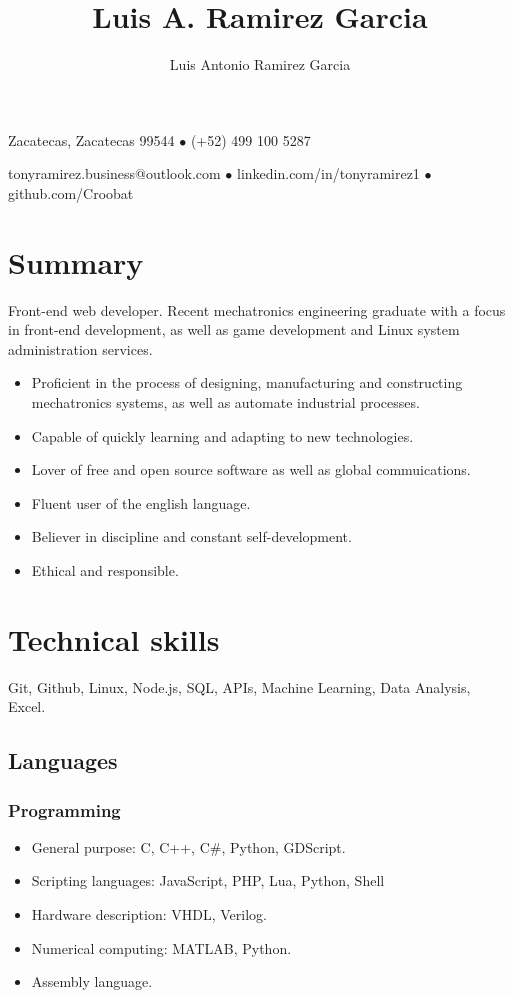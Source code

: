 \documentclass{article}
\author{Luis Antonio Ramirez Garcia}
\title{Luis A. Ramirez Garcia}
\makeatletter
\renewcommand{\maketitle}{
  \begin{center}
    {
      \huge\bfseries
      \theauthor
    }

    \vspace{1em}

    Zacatecas, Zacatecas 99544 $\bullet$ (+52) 499 100 5287

    \vspace{0.5em}

    tonyramirez.business@outlook.com $\bullet$ linkedin.com/in/tonyramirez1 $\bullet$ github.com/Croobat

    \vspace{-0.5em}

  \end{center}
}
\makeatother
\begin{document}

  \maketitle

  \section{Summary}

  Front-end web developer. Recent mechatronics engineering graduate with a focus in front-end development, as well as game development and Linux system administration services.

  \begin{itemize}
    \item Proficient in the process of designing, manufacturing and constructing mechatronics systems, as well as automate industrial processes.

    \item Capable of quickly learning and adapting to new technologies.

    \item Lover of free and open source software as well as global commuications.

    \item Fluent user of the english language.

    \item Believer in discipline and constant self-development.

    \item Ethical and responsible.
  \end{itemize}


  \section{Technical skills}

  Git, Github, Linux, Node.js, SQL, APIs, Machine Learning, Data Analysis, Excel.

    \subsection{Languages}

    \subsubsection{Programming}

    \begin{itemize}
      \item General purpose: C, C++, C\#, Python, GDScript.
      \item Scripting languages: JavaScript, PHP, Lua, Python, Shell
      \item Hardware description: VHDL, Verilog.
      \item Numerical computing: MATLAB, Python.
      \item Assembly language.
    \end{itemize}
\end{document}
